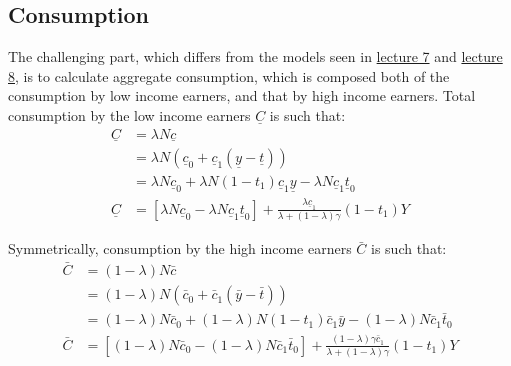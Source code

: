 \documentclass[]{book}
\theoremstyle{definition}
\theoremstyle{definition}
\theoremstyle{definition}
\theoremstyle{remark}
\begin{document}
\subsection{Consumption}\label{consumption}

The challenging part, which differs from the models seen in
\href{lecture7.html}{lecture 7} and \href{lecture8.html}{lecture 8}, is
to calculate aggregate consumption, which is composed both of the
consumption by low income earners, and that by high income earners.
Total consumption by the low income earners \(\underline{C}\) is such
that: \[
\begin{aligned}
\underline{C}&=\lambda N \underline{c}\\
&=\lambda N \left(\underline{c}_{0}+\underline{c}_{1}(\underline{y}-\underline{t})\right)\\
&=\lambda N  \underline{c}_{0} + \lambda N  (1-t_1) \underline{c}_{1}\underline{y}-\lambda N  \underline{c}_{1} \underline{t}_0\\
\underline{C}&=\left[\lambda N  \underline{c}_{0}-\lambda  N \underline{c}_{1} \underline{t}_0 \right]+ \frac{\lambda \underline{c}_{1}}{\lambda+(1-\lambda)\gamma}(1-t_1)Y
\end{aligned}
\]

Symmetrically, consumption by the high income earners \(\bar{C}\) is
such that: \[
\begin{aligned}
\bar{C}&=(1-\lambda) N \bar{c}\\
&=(1-\lambda) N \left(\bar{c}_{0}+\bar{c}_{1}(\bar{y}-\bar{t})\right)\\
&=(1-\lambda) N  \bar{c}_{0} + (1-\lambda) N (1-t_1) \bar{c}_{1}\bar{y}-(1-\lambda) N  \bar{c}_{1} \bar{t}_0\\
\bar{C}&=\left[(1-\lambda) N  \bar{c}_{0}-(1-\lambda) N  \bar{c}_{1} \bar{t}_0\right] + \frac{(1-\lambda) \gamma\bar{c}_{1}}{\lambda+(1-\lambda)\gamma}(1-t_1)Y
\end{aligned}
\]
\end{document}
